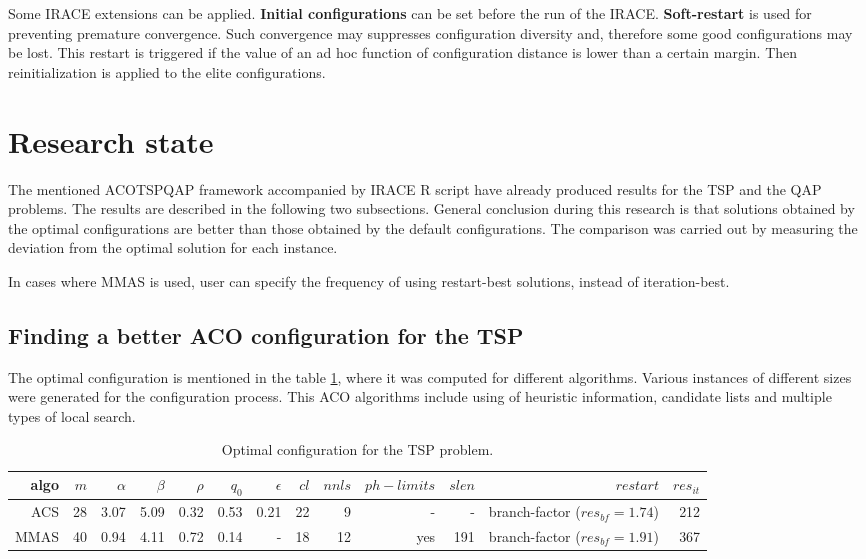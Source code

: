 \documentclass[12pt]{article}
\begin{document}
Some IRACE extensions can be applied. \textbf{Initial configurations} can be set before the run of the IRACE. \textbf{Soft-restart} is used for preventing premature convergence. Such convergence may suppresses configuration diversity and, therefore some good configurations may be lost. This restart is triggered if the value of an ad hoc function of configuration distance is lower than a certain margin. Then reinitialization is applied to the elite configurations.


\section{Research state}

The mentioned ACOTSPQAP framework accompanied by IRACE R script have already produced results for the TSP and the QAP problems. The results are described in the following two subsections. General conclusion during this research is that solutions obtained by the optimal configurations are better than those obtained by the default configurations. The comparison was carried out by measuring the deviation from the optimal solution for each instance.

In cases where MMAS is used, user can specify the frequency of using restart-best solutions, instead of iteration-best.

\subsection{Finding a better ACO configuration for the TSP}

The optimal configuration is mentioned in the table \ref{table:table-tsp}, where it was computed for different algorithms. Various instances of different sizes were generated for the configuration process. This ACO algorithms include using of heuristic information, candidate lists and multiple types of local search.

\begin{table}[ht]
\centering
\resizebox{\textwidth}{!}
{
\begin{tabular}{|r|r|r|r|r|r|r|r|r|r|r|r|r|}
  \hline 
    algo & $m$ & $\alpha$ & $\beta$ & $\rho$ & $q_0$ & $\epsilon$ & $cl$ & $nnls$ & $ph-limits$ & $slen$ & $restart$ & $res_{it}$\\ \hline
    ACS & 28 & 3.07 & 5.09 & 0.32 & 0.53 & 0.21 & 22 & 9 & - & - & branch-factor ($res_{bf} = 1.74$) & 212\\ \hline
	MMAS & 40 & 0.94 & 4.11 & 0.72 & 0.14 & - & 18 & 12 & yes & 191 & branch-factor ($res_{bf} = 1.91$) & 367\\ \hline
\end{tabular}
}
\caption{Optimal configuration for the TSP problem.}
\label{table:table-tsp} 
\end{table} 
\end{document}
